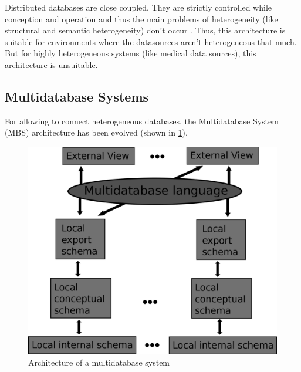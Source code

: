 Distributed databases are close coupled. They are strictly controlled while conception and operation and thus the main problems of heterogeneity (like structural and semantic heterogeneity) don't occur \cite[p. 93]{DBLP:books/dp/LeserN2006}. Thus, this architecture is suitable for environments where the datasources aren't heterogeneous that much. But for highly heterogeneous systems (like medical data sources), this architecture is unsuitable. 

\subsection{Multidatabase Systems}

For allowing to connect heterogeneous databases, the Multidatabase System (MBS) architecture has been evolved (shown in \ref{MBSDatabaseArchitecture}). 

\begin{figure}[H]
	\begin{center}
		\includegraphics[scale=0.5]{figures/MultidatabaseArchitecture.png}
	\end{center}
	\caption{Architecture of a  multidatabase system \cite[p. 94]{DBLP:books/dp/LeserN2006}}
	\label{MBSDatabaseArchitecture}
\end{figure}

